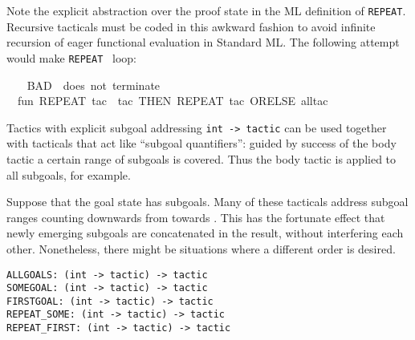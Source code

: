 \begin{isabellebody}
\begin{isamarkuptext}
  \begin{warn}
  Note the explicit abstraction over the proof state in the ML
  definition of \verb|REPEAT|.  Recursive tacticals must be coded in
  this awkward fashion to avoid infinite recursion of eager functional
  evaluation in Standard ML.  The following attempt would make \verb|REPEAT|~ loop:
  \end{warn}%
\end{isamarkuptext}%
\isamarkuptrue%
%
\isadelimML
%
\endisadelimML
%
\isatagML
{}\isamarkupfalse%
\ {}\isanewline
\ \ {}{}BAD\ {}{}\ does\ not\ terminate{}{}{}\isanewline
\ \ fun\ REPEAT\ tac\ {}\ {}tac\ THEN\ REPEAT\ tac{}\ ORELSE\ all{}tac{}\isanewline
{}%
\endisatagML
{\isafoldML}%
%
\isadelimML
%
\endisadelimML
%
\isamarkuptrue%
%
\begin{isamarkuptext}%
Tactics with explicit subgoal addressing
  \verb|int -> tactic| can be used together with tacticals that
  act like ``subgoal quantifiers'': guided by success of the body
  tactic a certain range of subgoals is covered.  Thus the body tactic
  is applied to all subgoals, for example.

  Suppose that the goal state has  subgoals.  Many of
  these tacticals address subgoal ranges counting downwards from
   towards .  This has the fortunate effect that
  newly emerging subgoals are concatenated in the result, without
  interfering each other.  Nonetheless, there might be situations
  where a different order is desired.%
\end{isamarkuptext}%
\isamarkuptrue%
%
\isadelimmlref
%
\endisadelimmlref
%
\isatagmlref
%
\begin{isamarkuptext}%
\begin{mldecls}
  \verb|ALLGOALS: (int -> tactic) -> tactic| \\
  \verb|SOMEGOAL: (int -> tactic) -> tactic| \\
  \verb|FIRSTGOAL: (int -> tactic) -> tactic| \\
  \verb|REPEAT_SOME: (int -> tactic) -> tactic| \\
  \verb|REPEAT_FIRST: (int -> tactic) -> tactic| \\
  \end{mldecls}


\end{isamarkuptext}
\end{isabellebody}
